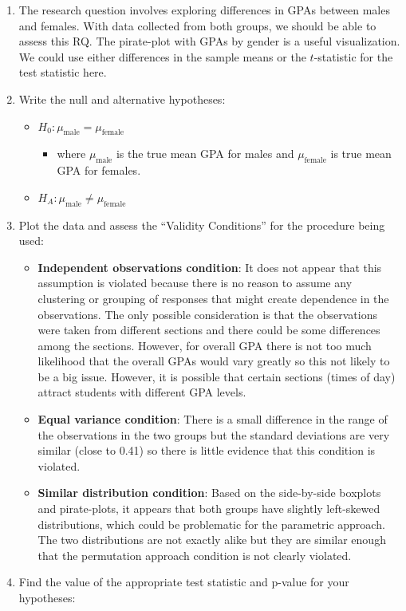 \documentclass[
]{book}
\providecommand{\tightlist}{%
  \setlength{\itemsep}{0pt}\setlength{\parskip}{0pt}}
\begin{document}
\begin{enumerate}
\def\labelenumi{\arabic{enumi}.}
\setcounter{enumi}{-1}
\item
  The research question involves exploring differences in GPAs between males and females. With data collected from both groups, we should be able to assess this RQ. The pirate-plot with GPAs by gender is a useful visualization. We could use either differences in the sample means or the \(t\)-statistic for the test statistic here.
\item
  Write the null and alternative hypotheses:

  \begin{itemize}
  \item
    \(H_0: \mu_\text{male} = \mu_\text{female}\)

    \begin{itemize}
    \tightlist
    \item
      where \(\mu_\text{male}\) is the true mean GPA for males and
      \(\mu_\text{female}\) is true mean GPA for females.
    \end{itemize}
  \item
    \(H_A: \mu_\text{male} \ne \mu_\text{female}\)
  \end{itemize}
\item
  Plot the data and assess the ``Validity Conditions'' for the procedure being used:

  \begin{itemize}
  \item
    \textbf{Independent observations condition}: It does not appear that this assumption
    is violated because there is no reason to assume any clustering or grouping of
    responses that might create dependence in the observations. The only
    possible consideration is that the observations were taken from different
    sections and there could be some differences among the sections. However,
    for overall GPA there is not too much likelihood that the overall GPAs
    would vary greatly so this not likely to be a big issue. However, it is possible that certain sections (times of day) attract
    students with different GPA levels.
  \item
    \textbf{Equal variance condition}: There is a small difference in the range
    of the observations in the two groups but the standard deviations are very
    similar (close to 0.41) so there is little evidence that this condition is violated.
  \item
    \textbf{Similar distribution condition}: Based on the side-by-side boxplots and
    pirate-plots, it appears that both groups have slightly left-skewed
    distributions, which could be problematic for the parametric approach. The two distributions are not exactly alike but
    they are similar enough that the permutation approach condition is not clearly violated.
  \end{itemize}
\item
  Find the value of the appropriate test statistic and p-value for your hypotheses:


\end{enumerate}
\end{document}
